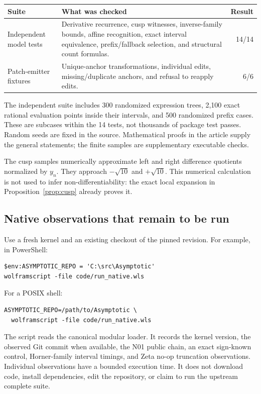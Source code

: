 \documentclass[11pt,a4paper]{article}
\begin{document}
\begin{tabularx}{\textwidth}{@{}lXr@{}}
\toprule Suite & What was checked & Result\\\midrule
Independent model tests & Derivative recurrence, cusp witnesses, inverse-family bounds, affine recognition, exact interval equivalence, prefix/fallback selection, and structural count formulas. & 14/14\\
Patch-emitter fixtures & Unique-anchor transformations, individual edits, missing/duplicate anchors, and refusal to reapply edits. & 6/6\\
\bottomrule
\end{tabularx}

The independent suite includes 300 randomized expression trees, 2,100 exact
rational evaluation points inside their intervals, and 500 randomized prefix
cases. These are subcases within the 14 tests, not thousands of package test
passes. Random seeds are fixed in the source. Mathematical proofs in the article
supply the general statements; the finite samples are supplementary executable
checks.

The cusp samples numerically approximate left and right difference quotients
normalized by $y_n$. They approach $-\sqrt{10}$ and $+\sqrt{10}$. This numerical
calculation is not used to infer non-differentiability: the exact local expansion
in Proposition~\ref{prop:cusp} already proves it.

\subsection{Native observations that remain to be run}
Use a fresh kernel and an existing checkout of the pinned revision. For example,
in PowerShell:
\begin{lstlisting}
$env:ASYMPTOTIC_REPO = 'C:\src\Asymptotic'
wolframscript -file code/run_native.wls
\end{lstlisting}
For a POSIX shell:
\begin{lstlisting}
ASYMPTOTIC_REPO=/path/to/Asymptotic \
  wolframscript -file code/run_native.wls
\end{lstlisting}
The script reads the canonical modular loader. It records the kernel version,
the observed Git commit when available, the N01 public chain, an exact
sign-known control, Horner-family interval timings, and Zeta no-op truncation
observations. Individual observations have a bounded execution time. It does
not download code, install dependencies, edit the repository, or claim to run
the upstream complete suite.
\end{document}
